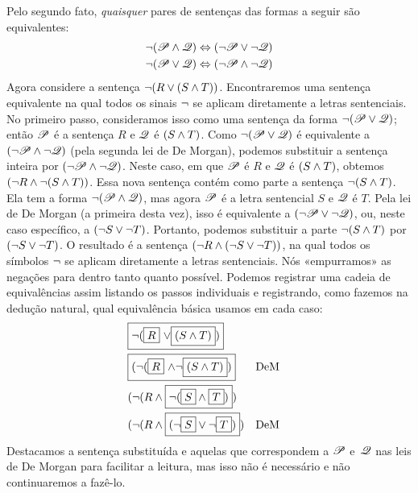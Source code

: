 Pelo segundo fato, \emph{quaisquer} pares de sentenças das formas a seguir são equivalentes:
\begin{align*}
	\neg (\mathscr{P} \wedge \mathscr{Q}) & \Leftrightarrow (\neg \mathscr{P} \vee \neg \mathscr{Q})\\
	\neg (\mathscr{P} \vee \mathscr{Q}) & \Leftrightarrow (\neg \mathscr{P} \wedge \neg \mathscr{Q})
\end{align*}
Agora considere a sentença $\neg(R \vee (S \wedge T))$. Encontraremos uma sentença equivalente na qual todos os sinais $\neg$ se aplicam diretamente a letras sentenciais. No primeiro passo, consideramos isso como uma sentença da forma $\neg(\mathscr{P} \vee \mathscr{Q})$; então $\mathscr{P}$ é a sentença $R$ e $\mathscr{Q}$ é $(S \wedge T)$. Como $\neg(\mathscr{P} \vee \mathscr{Q})$ é equivalente a $(\neg \mathscr{P} \wedge \neg \mathscr{Q})$ (pela segunda lei de De Morgan), podemos substituir a sentença inteira por $(\neg \mathscr{P} \wedge \neg \mathscr{Q})$. Neste caso, em que $\mathscr{P}$ é $R$ e $\mathscr{Q}$ é $(S \wedge T)$, obtemos $(\neg R \wedge \neg (S \wedge T))$. Essa nova sentença contém como parte a sentença $\neg (S \wedge T)$. Ela tem a forma $\neg(\mathscr{P} \wedge \mathscr{Q})$, mas agora $\mathscr{P}$ é a letra sentencial $S$ e $\mathscr{Q}$ é $T$. Pela lei de De Morgan (a primeira desta vez), isso é equivalente a $(\neg\mathscr{P} \vee \neg\mathscr{Q})$, ou, neste caso específico, a $(\neg S \vee \neg T)$. Portanto, podemos substituir a parte $\neg (S \wedge T)$ por $(\neg S \vee \neg T)$. O resultado é a sentença $(\neg R \wedge (\neg S \vee \neg T))$, na qual todos os símbolos $\neg$ se aplicam diretamente a letras sentenciais. Nós «empurramos» as negações para dentro tanto quanto possível. Podemos registrar uma cadeia de equivalências assim listando os passos individuais e registrando, como fazemos na dedução natural, qual equivalência básica usamos em cada caso:
\begin{align*}
	& \fbox{\ensuremath{\neg}(\fbox{$R$} \ensuremath{\vee}\fbox{$(S \wedge T)$})} \\
	& \fbox{(\ensuremath{\neg}(\fbox{$R$} \ensuremath{\wedge}\ensuremath{\neg}\fbox{$(S \wedge T)$})} && \text{DeM}\\
	& (\neg(R \wedge \fbox{$\neg(\fbox{$S$} \wedge \fbox{$T$})$}) \\
	& (\neg(R \wedge \fbox{$(\neg \fbox{$S$} \vee \neg \fbox{$T$})$}) && \text{DeM}
\end{align*}
Destacamos a sentença substituída e aquelas que correspondem a $\mathscr{P}$ e~$\mathscr{Q}$ nas leis de De Morgan para facilitar a leitura, mas isso não é necessário e não continuaremos a fazê-lo.

